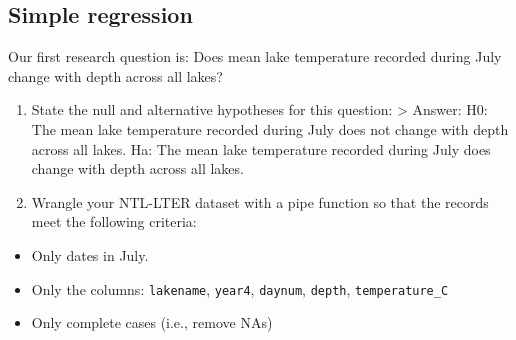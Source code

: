 \documentclass[
]{article}
\newenvironment{Shaded}{\begin{snugshade}}{\end{snugshade}}
\newcommand{\AttributeTok}[1]{\textcolor[rgb]{0.77,0.63,0.00}{#1}}
\newcommand{\CommentTok}[1]{\textcolor[rgb]{0.56,0.35,0.01}{\textit{#1}}}
\newcommand{\ConstantTok}[1]{\textcolor[rgb]{0.00,0.00,0.00}{#1}}
\newcommand{\DecValTok}[1]{\textcolor[rgb]{0.00,0.00,0.81}{#1}}
\newcommand{\FunctionTok}[1]{\textcolor[rgb]{0.00,0.00,0.00}{#1}}
\newcommand{\NormalTok}[1]{#1}
\newcommand{\OtherTok}[1]{\textcolor[rgb]{0.56,0.35,0.01}{#1}}
\newcommand{\SpecialCharTok}[1]{\textcolor[rgb]{0.00,0.00,0.00}{#1}}
\newcommand{\StringTok}[1]{\textcolor[rgb]{0.31,0.60,0.02}{#1}}
\providecommand{\tightlist}{%
  \setlength{\itemsep}{0pt}\setlength{\parskip}{0pt}}
\begin{document}
\begin{Shaded}
\end{Shaded}

\hypertarget{simple-regression}{%
\subsection{Simple regression}\label{simple-regression}}

Our first research question is: Does mean lake temperature recorded
during July change with depth across all lakes?

\begin{enumerate}
\def\labelenumi{\arabic{enumi}.}
\setcounter{enumi}{2}
\item
  State the null and alternative hypotheses for this question:
  \textgreater{} Answer: H0: The mean lake temperature recorded during
  July does not change with depth across all lakes. Ha: The mean lake
  temperature recorded during July does change with depth across all
  lakes.
\item
  Wrangle your NTL-LTER dataset with a pipe function so that the records
  meet the following criteria:
\end{enumerate}

\begin{itemize}
\tightlist
\item
  Only dates in July.
\item
  Only the columns: \texttt{lakename}, \texttt{year4}, \texttt{daynum},
  \texttt{depth}, \texttt{temperature\_C}
\item
  Only complete cases (i.e., remove NAs)
\end{itemize}
\end{document}
